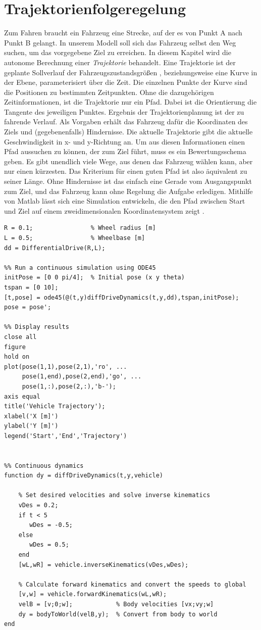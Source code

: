\section{Trajektorienfolgeregelung}
\label{sec:trajektorienfolgeregelung}
Zum Fahren braucht ein Fahrzeug eine Strecke, auf der es von Punkt A nach Punkt B gelangt. In unserem Modell soll sich das Fahrzeug selbst den Weg suchen, um das vorgegebene Ziel zu erreichen. In diesem Kapitel wird die autonome Berechnung einer \textit{Trajektorie} behandelt. 
Eine Trajektorie ist der geplante Sollverlauf der Fahrzeugszustandsgrößen \cite{trajDef}, beziehungsweise eine Kurve in der Ebene, parameterisiert über die Zeit. Die einzelnen Punkte der Kurve sind die Positionen zu bestimmten Zeitpunkten. Ohne die dazugehörigen Zeitinformationen, ist die Trajektorie nur ein Pfad. Dabei ist die Orientierung die Tangente des jeweiligen Punktes.
Ergebnis der Trajektorienplanung ist der zu fahrende Verlauf. Als Vorgaben erhält das Fahrzeug dafür die Koordinaten des Ziels und (gegebenenfalls) Hindernisse. 
Die aktuelle Trajektorie gibt die aktuelle Geschwindigkeit in x- und y-Richtung an.
Um aus diesen Informationen einen Pfad aussuchen zu können, der zum Ziel führt, muss es ein Bewertungsschema geben. Es gibt unendlich viele Wege, aus denen das Fahrzeug wählen kann, aber nur einen kürzesten. Das Kriterium für einen guten Pfad ist also äquivalent zu seiner Länge. Ohne Hindernisse ist das einfach eine Gerade vom Ausgangspunkt zum Ziel, und das Fahrzeug kann ohne Regelung die Aufgabe erledigen.
Mithilfe von Matlab lässt sich eine Simulation entwickeln, die den Pfad zwischen Start und Ziel auf einem zweidimensionalen Koordinatensystem zeigt \cite{ml}. 
\lstset{language=Matlab}          
\begin{lstlisting}[frame=single]
%% EXAMPLE: Differential Drive continuous simulation
R = 0.1;                % Wheel radius [m]
L = 0.5;                % Wheelbase [m]
dd = DifferentialDrive(R,L);

%% Run a continuous simulation using ODE45
initPose = [0 0 pi/4];  % Initial pose (x y theta)
tspan = [0 10];
[t,pose] = ode45(@(t,y)diffDriveDynamics(t,y,dd),tspan,initPose);
pose = pose';

%% Display results
close all
figure
hold on
plot(pose(1,1),pose(2,1),'ro', ...
     pose(1,end),pose(2,end),'go', ...
     pose(1,:),pose(2,:),'b-');
axis equal
title('Vehicle Trajectory');
xlabel('X [m]')
ylabel('Y [m]')
legend('Start','End','Trajectory')


%% Continuous dynamics
function dy = diffDriveDynamics(t,y,vehicle)
    
    % Set desired velocities and solve inverse kinematics
    vDes = 0.2;
    if t < 5
       wDes = -0.5; 
    else
       wDes = 0.5;
    end
    [wL,wR] = vehicle.inverseKinematics(vDes,wDes);
    
    % Calculate forward kinematics and convert the speeds to global
    [v,w] = vehicle.forwardKinematics(wL,wR);
    velB = [v;0;w];            % Body velocities [vx;vy;w]
    dy = bodyToWorld(velB,y);  % Convert from body to world
end
\end{lstlisting}
